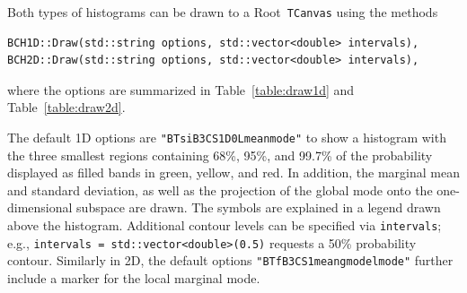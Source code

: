 \documentclass[11pt, a4paper]{article}
\newcommand{\Root}{{\sc Root}}
\begin{document}
Both types of histograms can be drawn to a \Root\ \verb|TCanvas| using
the methods
%
\begin{verbatim}
BCH1D::Draw(std::string options, std::vector<double> intervals),
BCH2D::Draw(std::string options, std::vector<double> intervals),
\end{verbatim}
%
where the options are summarized in Table~\ref{table:draw1d} and
Table~\ref{table:draw2d}.

The default 1D options are \texttt{"BTsiB3CS1D0Lmeanmode"} to show a
histogram with the three smallest regions containing 68\%, 95\%, and
99.7\% of the probability displayed as filled bands in green, yellow,
and red. In addition, the marginal mean and standard deviation, as
well as the projection of the global mode onto the one-dimensional
subspace are drawn. The symbols are explained in a legend drawn above
the histogram. Additional contour levels can be specified via
\texttt{intervals}; e.g., \verb|intervals = std::vector<double>(0.5)|
requests a 50\% probability contour. Similarly in 2D, the default
options \verb|"BTfB3CS1meangmodelmode"| further include a marker for
the local marginal mode.
\end{document}

